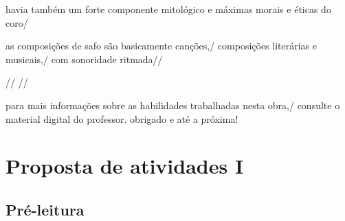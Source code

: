 \documentclass[12pt]{extarticle}
\begin{document}
havia também um forte componente mitológico e máximas morais e éticas do coro/

as composições de safo são basicamente canções,/ composições literárias e musicais,/ com sonoridade ritmada//

 //
//
 
para mais informações sobre as habilidades trabalhadas nesta obra,/ consulte o material digital do professor. obrigado e até a próxima!


\section{Proposta de atividades I}


\subsection{Pré-leitura}







\end{document}
